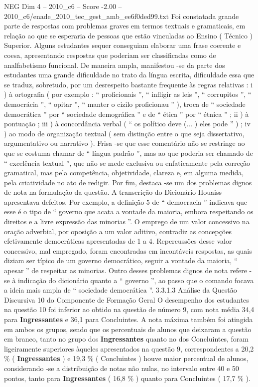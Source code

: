 \begin{textsample}{NEG Dim 4 – 2010\_c6 – Score -2.00 – 2010\_c6/enade\_2010\_tec\_gest\_amb\_ee6f0ded99.txt}
Foi constatada grande parte de respostas com problemas graves em termos textuais e gramaticais, em relação ao que se esperaria de pessoas que estão vinculadas ao Ensino ( Técnico ) Superior.
Alguns estudantes sequer conseguiam elaborar uma frase coerente e coesa, apresentando respostas que poderiam ser classificadas como de analfabetismo funcional.
De maneira ampla, manifestou -se da parte dos estudantes uma grande dificuldade no trato da língua escrita, dificuldade essa que se traduz, sobretudo, por um desrespeito bastante frequente às regras relativas : i ) à ortografia ( por exemplo : “ proficionais ”, “ infligir as leis ”, “ corrupitos ”, “ democrácia ”, “ opitar ”, “ manter o cizilo proficionau ” ), troca de “ sociedade democrática ” por “ sociedade demográfica ” e de “ ética ” por “ étnica ” ; ii ) à pontuação ; iii ) à concordância verbal ( “ os político deve (... ) eles pode ” ) ; iv ) ao modo de organização textual ( sem distinção entre o que seja dissertativo, argumentativo ou narrativo ).
Frisa -se que esse comentário não se restringe ao que se costuma chamar de “ língua padrão ”, mas ao que poderia ser chamado de “ excelência textual ”, que não se mede exclusiva ou enfaticamente pela correção gramatical, mas pela competência, objetividade, clareza e, em alguma medida, pela criatividade no ato de redigir.
Por fim, destaca -se um dos problemas dignos de nota na formulação da questão.
A transcrição do Dicionário Houaiss apresentava defeitos.
Por exemplo, a definição 5 de “ democracia ” indicava que esse é o tipo de “ governo que acata a vontade da maioria, embora respeitando os direitos e a livre expressão das minorias ”.
O emprego de um valor concessivo na oração adverbial, por oposição a um valor aditivo, contradiz as concepções efetivamente democráticas apresentadas de 1 a 4.
Repercussões desse valor concessivo, mal empregado, foram encontradas em incontáveis respostas, as quais diziam ser típico de um governo democrático, seguir a vontade da maioria, “ apesar ” de respeitar as minorias.
Outro desses problemas dignos de nota refere -se à indicação do dicionário quanto a “ governo ”, ao passo que o comando focava a ideia mais ampla de “ sociedade democrática ”. 3.3.1.3 Análise da Questão Discursiva 10 do Componente de Formação Geral O desempenho dos estudantes na questão 10 foi inferior ao obtido na questão de número 9, com nota média 34,4 para \textbf{Ingressantes} e 36,1 para Concluintes.
A nota máxima também foi atingida em ambos os grupos, sendo que os percentuais de alunos que deixaram a questão em branco, tanto no grupo dos \textbf{Ingressantes} quanto no dos Concluintes, foram ligeiramente superiores àqueles apresentados na questão 9, correspondentes a 20,2 \% ( \textbf{Ingressantes} ) e 19,3 \% ( Concluintes ) houve maior percentual de alunos, considerando -se a distribuição de notas não nulas, no intervalo entre 40 e 50 pontos, tanto para \textbf{Ingressantes} ( 16,8 \% ) quanto para Concluintes ( 17,7 \% ).

\end{textsample}
